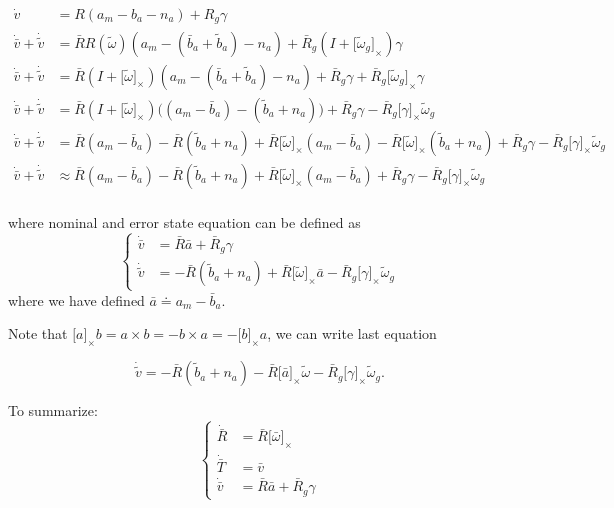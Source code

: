 \documentclass[letter,10pt]{article}
\newcommand{\asym}[1]{{\lbrack #1\rbrack}_\times{}}
\begin{document}
\begin{equation}
\begin{aligned}
 \dot v &= R(a_m-b_a-n_a) + R_g \gamma \\
 \dot{\bar v} + \dot{\tilde v} &= \bar R R(\tilde \omega) (a_m-(\bar b_a+\tilde b_a)-n_a) + \bar R_g(I + \asym{\tilde\omega_g}) \gamma \\
 \dot{\bar v} + \dot{\tilde v} &= \bar R (I+\asym{\tilde\omega}) (a_m-(\bar b_a+\tilde b_a)-n_a) + \bar R_g \gamma + \bar R_g \asym{\tilde\omega_g} \gamma\\
 \dot{\bar v} + \dot{\tilde v} &= \bar R (I+\asym{\tilde\omega}) \big( (a_m-\bar b_a) - (\tilde b_a+n_a) \big) + \bar R_g \gamma - \bar R_g \asym{\gamma}\tilde\omega_g\\
 \dot{\bar v} + \dot{\tilde v} &= \bar R (a_m-\bar b_a) -\bar R (\tilde b_a + n_a) + \bar R \asym{\tilde\omega}(a_m-\bar b_a)- \bar R\asym{\tilde\omega}(\tilde b_a+n_a) + \bar R_g \gamma - \bar R_g \asym{\gamma}\tilde\omega_g \\
 \dot{\bar v} + \dot{\tilde v} &\approx \bar R (a_m-\bar b_a) -\bar R (\tilde b_a + n_a) + \bar R \asym{\tilde\omega}(a_m-\bar b_a) + \bar R_g \gamma - \bar R_g \asym{\gamma}\tilde\omega_g\\
\end{aligned}
 \label{eq-velocity-derivation}
\end{equation}

where nominal and error state equation can be defined as
\begin{equation}
\begin{cases}
\dot{\bar v} &= \bar R\bar a + \bar R_g \gamma\\
\dot{\tilde v} &= -\bar R(\tilde b_a + n_a) + \bar R \asym{\tilde\omega}\bar a - \bar R_g \asym{\gamma} \tilde\omega_g 
\end{cases}
\end{equation}
where we have defined $\bar a \doteq a_m - \bar b_a$.

Note that $\asym{a}b=a\times b=-b\times a=-\asym{b} a$, we can write last equation 

\begin{equation}
\dot{\tilde v}=-\bar R(\tilde b_a + n_a) - \bar R\asym{\bar a} \tilde \omega- \bar R_g \asym{\gamma} \tilde \omega_g.
\end{equation}

To summarize:
\begin{equation}
\begin{cases}
\dot{\bar R} &= \bar R\asym{\bar \omega}\\
\dot{\bar T} &= \bar v\\
\dot{\bar v} &= \bar R \bar a + \bar R_g \gamma
\end{cases}
\label{eq:nominal-dynamics}
\end{equation}
\end{document}
